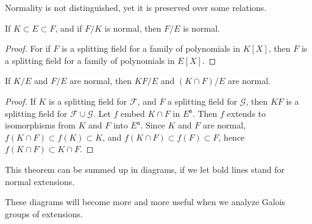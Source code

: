 Normality is not distinguished, yet it is preserved over some relations.

\begin{theorem}
    If $K \subset E \subset F$, and if $F/K$ is normal, then $F/E$ is normal.
\end{theorem}
\begin{proof}
    For if $F$ is a splitting field for a family of polynomials in $K[X]$, then $F$ is a splitting field for a family of polynomials in $E[X]$.
\end{proof}

\begin{theorem}
    If $K/E$ and $F/E$ are normal, then $KF/E$ and $(K \cap F)/ E$ are normal.
\end{theorem}
\begin{proof}
    If $K$ is a splitting field for $\mathcal{F}$, and $F$ a splitting field for $\mathcal{G}$, then $KF$ is a splitting field for $\mathcal{F} \cup \mathcal{G}$. Let $f$ embed $K \cap F$ in $E^{\mathfrak{a}}$. Then $f$ extends to isomorphisms from $K$ and $F$ into $E^{\mathfrak{a}}$. Since $K$ and $F$ are normal, $f(K \cap F) \subset f(K) \subset K$, and $f(K \cap F) \subset f(F) \subset F$, hence $f(K \cap F) \subset K \cap F$.
\end{proof}

This theorem can be summed up in diagrams, if we let bold lines stand for normal extensions.
%
\begin{center}
\end{center}
%
These diagrams will become more and more useful when we analyze Galois groups of extensions.










